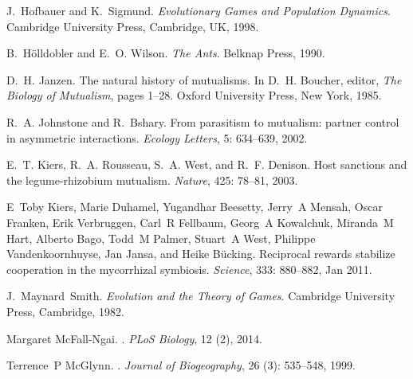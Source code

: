 \documentclass[12pt]{article}
\begin{document}
\begin{thebibliography}{61}
J.~Hofbauer and K.~Sigmund.
\newblock \emph{Evolutionary Games and Population Dynamics}.
\newblock Cambridge University Press, Cambridge, UK, 1998.

B.~H{\"o}lldobler and E.~O. Wilson.
\newblock \emph{The Ants}.
\newblock Belknap Press, 1990.

D.~H. Janzen.
\newblock The natural history of mutualisms.
\newblock In D.~H. Boucher, editor, \emph{The Biology of Mutualism}, pages
  1--28. Oxford University Press, New York, 1985.

R.~A. Johnstone and R.~Bshary.
\newblock From parasitism to mutualism: partner control in asymmetric
  interactions.
\newblock \emph{Ecology Letters}, 5: 634--639, 2002.

E.~T. Kiers, R.~A. Rousseau, S.~A. West, and R.~F. Denison.
\newblock Host sanctions and the legume-rhizobium mutualism.
\newblock \emph{Nature}, 425: 78--81, 2003.

E~Toby Kiers, Marie Duhamel, Yugandhar Beesetty, Jerry~A Mensah, Oscar Franken,
  Erik Verbruggen, Carl~R Fellbaum, Georg~A Kowalchuk, Miranda~M Hart, Alberto
  Bago, Todd~M Palmer, Stuart~A West, Philippe Vandenkoornhuyse, Jan Jansa, and
  Heike B{\"u}cking.
\newblock Reciprocal rewards stabilize cooperation in the mycorrhizal
  symbiosis.
\newblock \emph{Science}, 333: 880--882, Jan 2011.

J.~Maynard~Smith.
\newblock \emph{Evolution and the Theory of Games}.
\newblock Cambridge University Press, Cambridge, 1982.

Margaret McFall-Ngai.
.
\newblock \emph{PLoS Biology}, 12 (2), 2014.

Terrence~P McGlynn.
.
\newblock \emph{Journal of Biogeography}, 26 (3): 535--548,
  1999.


\end{thebibliography}
\end{document}
